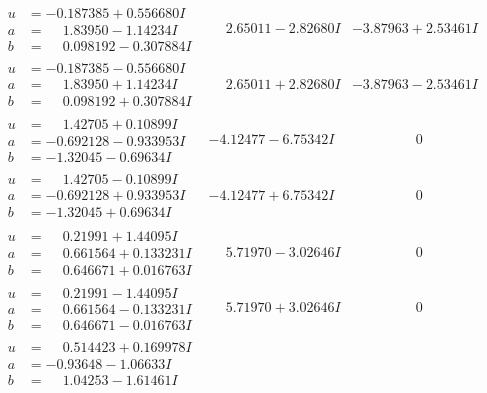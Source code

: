 \documentclass[1p]{elsarticle_modified}
\theoremstyle{definition}
\begin{document}
$$\begin{array}{c|c|c}
\begin{aligned}
u &= -0.187385 + 0.556680 I \\
a &= \phantom{-}1.83950 - 1.14234 I \\
b &= \phantom{-}0.098192 - 0.307884 I\end{aligned}
 & \phantom{-}2.65011 - 2.82680 I & -3.87963 + 2.53461 I \\ \hline\begin{aligned}
u &= -0.187385 - 0.556680 I \\
a &= \phantom{-}1.83950 + 1.14234 I \\
b &= \phantom{-}0.098192 + 0.307884 I\end{aligned}
 & \phantom{-}2.65011 + 2.82680 I & -3.87963 - 2.53461 I \\ \hline\begin{aligned}
u &= \phantom{-}1.42705 + 0.10899 I \\
a &= -0.692128 - 0.933953 I \\
b &= -1.32045 - 0.69634 I\end{aligned}
 & -4.12477 - 6.75342 I & \phantom{-0.000000 } 0 \\ \hline\begin{aligned}
u &= \phantom{-}1.42705 - 0.10899 I \\
a &= -0.692128 + 0.933953 I \\
b &= -1.32045 + 0.69634 I\end{aligned}
 & -4.12477 + 6.75342 I & \phantom{-0.000000 } 0 \\ \hline\begin{aligned}
u &= \phantom{-}0.21991 + 1.44095 I \\
a &= \phantom{-}0.661564 + 0.133231 I \\
b &= \phantom{-}0.646671 + 0.016763 I\end{aligned}
 & \phantom{-}5.71970 - 3.02646 I & \phantom{-0.000000 } 0 \\ \hline\begin{aligned}
u &= \phantom{-}0.21991 - 1.44095 I \\
a &= \phantom{-}0.661564 - 0.133231 I \\
b &= \phantom{-}0.646671 - 0.016763 I\end{aligned}
 & \phantom{-}5.71970 + 3.02646 I & \phantom{-0.000000 } 0 \\ \hline\begin{aligned}
u &= \phantom{-}0.514423 + 0.169978 I \\
a &= -0.93648 - 1.06633 I \\
b &= \phantom{-}1.04253 - 1.61461 I\end{aligned}

\end{array}$$
\end{document}

